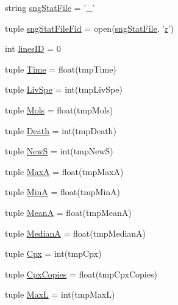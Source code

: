 \begin{DoxyCompactItemize}
\item 
string \hyperlink{namespacegeneral_statistics_a2b6dc22bc04220d81b7bb62826f0a5ad}{sng\-Stat\-File} = '\hyperlink{start_8m_a280c5f85d1264d1df5d06bc5ea8b550c}{\-\_\-}'
\item 
tuple \hyperlink{namespacegeneral_statistics_aa6bcf857bdf3f6f2f12ca093f0e59297}{sng\-Stat\-File\-Fid} = open(\hyperlink{namespacegeneral_statistics_a2b6dc22bc04220d81b7bb62826f0a5ad}{sng\-Stat\-File}, '\hyperlink{_k_s_search_launcher_8m_ac862e7284527eb913b1351c8bfb8e079}{r}')
\item 
int \hyperlink{namespacegeneral_statistics_aabdf31c148d67f609f1ba9a84c9239a6}{lines\-I\-D} = 0
\item 
tuple \hyperlink{namespacegeneral_statistics_a2755d118509228a47dd95be4a18734bb}{\-Time} = float(tmp\-Time)
\item 
tuple \hyperlink{namespacegeneral_statistics_a3d0e4581ae576e909d1449f0fe6ce4ec}{\-Liv\-Spe} = int(tmp\-Liv\-Spe)
\item 
tuple \hyperlink{namespacegeneral_statistics_afdf7a7822139d1447506bf98127d29d1}{\-Mols} = float(tmp\-Mols)
\item 
tuple \hyperlink{namespacegeneral_statistics_adf189f2548701e50989d743b810b998d}{\-Death} = int(tmp\-Death)
\item 
tuple \hyperlink{namespacegeneral_statistics_a0418b52e2bcb77390b50c70b94197f48}{\-New\-S} = int(tmp\-New\-S)
\item 
tuple \hyperlink{namespacegeneral_statistics_a8c7eaceb16faabc2452eb6ec26a244ce}{\-Max\-A} = float(tmp\-Max\-A)
\item 
tuple \hyperlink{namespacegeneral_statistics_af6172dcd5abbc1704a9159c48df2627c}{\-Min\-A} = float(tmp\-Min\-A)
\item 
tuple \hyperlink{namespacegeneral_statistics_a7401b301b0d33e936b080290d6c24800}{\-Mean\-A} = float(tmp\-Mean\-A)
\item 
tuple \hyperlink{namespacegeneral_statistics_ab5588d21a923247b4daefa52d179fca5}{\-Median\-A} = float(tmp\-Median\-A)
\item 
tuple \hyperlink{namespacegeneral_statistics_a01c3b02ff04ff7cd0ac095d94ce2158c}{\-Cpx} = int(tmp\-Cpx)
\item 
tuple \hyperlink{namespacegeneral_statistics_ab0724b4ad6530b45535743fb7939fd5a}{\-Cpx\-Copies} = float(tmp\-Cpx\-Copies)
\item 
tuple \hyperlink{namespacegeneral_statistics_a06985566d39675323e33de90bd0a73d7}{\-Max\-L} = int(tmp\-Max\-L)
\item 

\end{DoxyCompactItemize}
